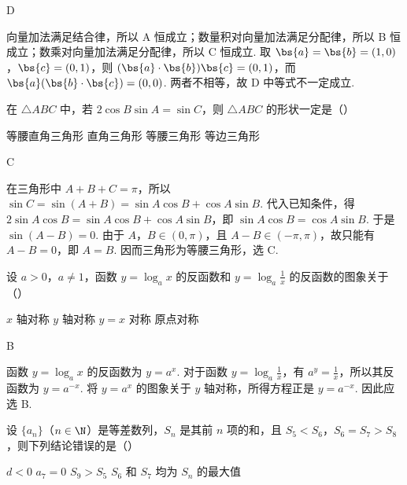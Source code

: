 \begin{answer}
D
\end{answer}

\begin{solution}
向量加法满足结合律，所以 A 恒成立；数量积对向量加法满足分配律，所以 B 恒成立；数乘对向量加法满足分配律，所以 C 恒成立.
取 \(\bs{a}=\bs{b}=(1,0)\)，\(\bs{c}=(0,1)\)，则 \((\bs{a}\cdot\bs{b})\bs{c}=(0,1)\)，而 \(\bs{a}(\bs{b}\cdot\bs{c})=(0,0)\). 两者不相等，故 D 中等式不一定成立.
\end{solution}

\begin{problem}
在 \(\triangle ABC\) 中，若 \(2\cos B\sin A = \sin C\)，则 \(\triangle ABC\) 的形状一定是（\quad）

\choices
    {等腰直角三角形}
    {直角三角形}
    {等腰三角形}
    {等边三角形}
\end{problem}

\begin{answer}
C
\end{answer}

\begin{solution}
在三角形中 \(A+B+C=\pi\)，所以 \(\sin C=\sin(A+B)=\sin A\cos B+\cos A\sin B\). 代入已知条件，得
\(2\sin A\cos B=\sin A\cos B+\cos A\sin B\)，即 \(\sin A\cos B=\cos A\sin B\).
于是 \(\sin(A-B)=0\). 由于 \(A\)，\(B\in(0,\pi)\)，且 \(A-B\in(-\pi,\pi)\)，故只能有 \(A-B=0\)，即 \(A=B\). 因而三角形为等腰三角形，选 C.
\end{solution}

\begin{problem}
设 \(a > 0\)，\(a \neq 1\)，函数 \(y = \log_a x\) 的反函数和 \(y = \log_a \frac{1}{x}\) 的反函数的图象关于（\quad）

\choices
    {\(x\) 轴对称}
    {\(y\) 轴对称}
    {\(y = x\) 对称}
    {原点对称}
\end{problem}

\begin{answer}
B
\end{answer}

\begin{solution}
函数 \(y=\log_a x\) 的反函数为 \(y=a^x\). 对于函数 \(y=\log_a\frac1x\)，有 \(a^y=\frac1x\)，所以其反函数为 \(y=a^{-x}\). 将 \(y=a^x\) 的图象关于 \(y\) 轴对称，所得方程正是 \(y=a^{-x}\). 因此应选 B.
\end{solution}

\begin{problem}
设 \(\{a_{n}\}\)（\(n \in \N\)）是等差数列，\(S_{n}\) 是其前 \(n\) 项的和，且 \(S_{5} < S_{6}\)，\(S_{6} = S_{7} > S_{8}\)，则下列结论错误的是（\quad）

\choices
    {\(d < 0\)}
    {\(a_{7} = 0\)}
    {\(S_{9} > S_{5}\)}
    {\(S_{6}\) 和 \(S_{7}\) 均为 \(S_{n}\) 的最大值}
\end{problem}


